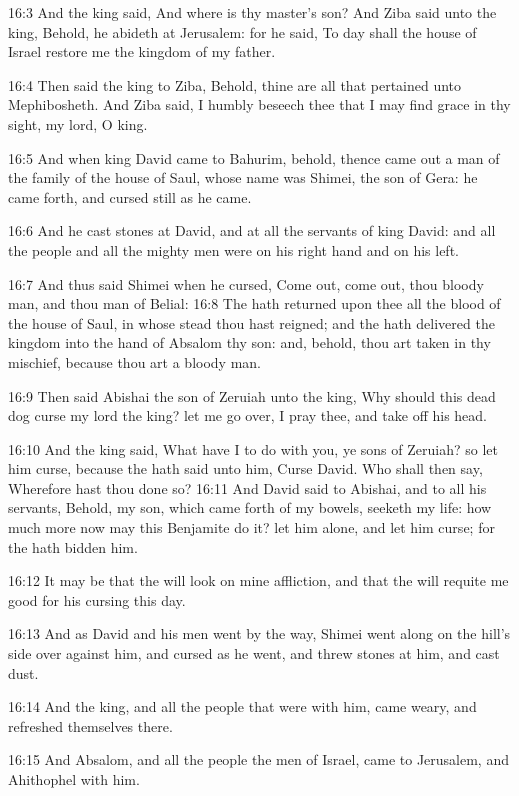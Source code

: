 16:3 And the king said, And where is thy master's son? And Ziba said
unto the king, Behold, he abideth at Jerusalem: for he said, To day
shall the house of Israel restore me the kingdom of my father.

16:4 Then said the king to Ziba, Behold, thine are all that pertained
unto Mephibosheth. And Ziba said, I humbly beseech thee that I may
find grace in thy sight, my lord, O king.

16:5 And when king David came to Bahurim, behold, thence came out a
man of the family of the house of Saul, whose name was Shimei, the son
of Gera: he came forth, and cursed still as he came.

16:6 And he cast stones at David, and at all the servants of king
David: and all the people and all the mighty men were on his right
hand and on his left.

16:7 And thus said Shimei when he cursed, Come out, come out, thou
bloody man, and thou man of Belial: 16:8 The \LORD hath returned upon
thee all the blood of the house of Saul, in whose stead thou hast
reigned; and the \LORD hath delivered the kingdom into the hand of
Absalom thy son: and, behold, thou art taken in thy mischief, because
thou art a bloody man.

16:9 Then said Abishai the son of Zeruiah unto the king, Why should
this dead dog curse my lord the king? let me go over, I pray thee, and
take off his head.

16:10 And the king said, What have I to do with you, ye sons of
Zeruiah?  so let him curse, because the \LORD hath said unto him, Curse
David. Who shall then say, Wherefore hast thou done so?  16:11 And
David said to Abishai, and to all his servants, Behold, my son, which
came forth of my bowels, seeketh my life: how much more now may this
Benjamite do it? let him alone, and let him curse; for the \LORD hath
bidden him.

16:12 It may be that the \LORD will look on mine affliction, and that
the \LORD will requite me good for his cursing this day.

16:13 And as David and his men went by the way, Shimei went along on
the hill's side over against him, and cursed as he went, and threw
stones at him, and cast dust.

16:14 And the king, and all the people that were with him, came weary,
and refreshed themselves there.

16:15 And Absalom, and all the people the men of Israel, came to
Jerusalem, and Ahithophel with him.

